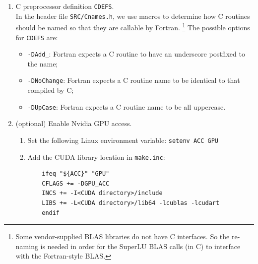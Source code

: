 \begin{enumerate}

   \vspace{-4pt}
   \hspace{.4in}{\tt METISLIB = -L\$(PARMETIS\_DIR)/build/Linux-x86\_64/libmetis -lmetis}

   \vspace{-4pt}
   \hspace{.4in}{\tt PARMETISLIB = -L\$(PARMETIS\_DIR)/build/Linux-x86\_64/libparmetis -lparmetis}

   \vspace{-4pt}
   \hspace{.4in}{\tt I\_PARMETIS = -I\$(PARMETIS\_DIR)/include -I\$(PARMETIS\_DIR)/metis/include}

\item C preprocessor definition {\tt CDEFS}.\\
   In the header file {\tt SRC/Cnames.h}, we use macros to determine how
   C routines should be named so that they are callable by Fortran.%
   \footnote{Some vendor-supplied BLAS libraries do not have C interfaces.
   So the re-naming is needed in order for the SuperLU BLAS calls (in C) to 
   interface with the Fortran-style BLAS.}
   The possible options for {\tt CDEFS} are:
   \begin{itemize}
   \item {\tt -DAdd\_}: Fortran expects a C routine to have an underscore
		        postfixed to the name;
   \item {\tt -DNoChange}: Fortran expects a C routine name to be identical to
		     that compiled by C;
   \item {\tt -DUpCase}: Fortran expects a C routine name to be all uppercase.
   \end{itemize}

\item (optional) Enable Nvidia GPU access.
   \begin{enumerate}
   \item Set the following Linux environment variable:
     {\tt setenv ACC GPU}
   \item Add the CUDA library location in {\tt make.inc}:
     \begin{verbatim}
    ifeq "${ACC}" "GPU"
    CFLAGS += -DGPU_ACC
    INCS += -I<CUDA directory>/include
    LIBS += -L<CUDA directory>/lib64 -lcublas -lcudart 
    endif
     \end{verbatim}
   \end{enumerate}
\end{enumerate}
   
